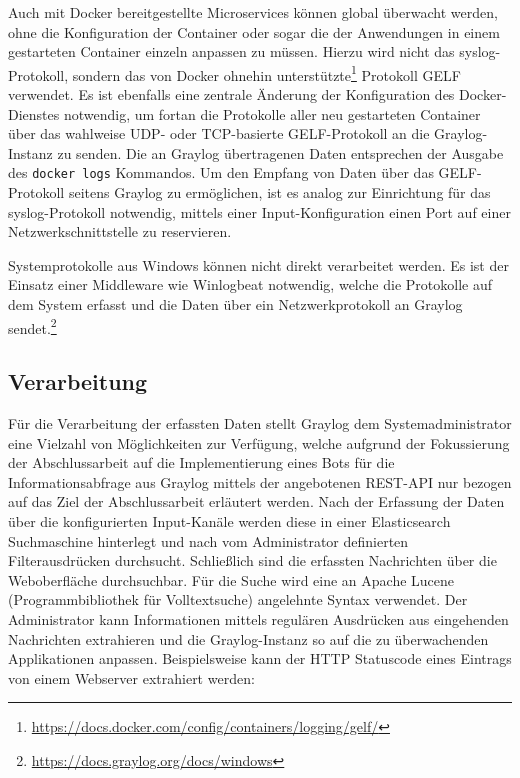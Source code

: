 Auch mit Docker bereitgestellte Microservices können global überwacht werden, ohne die Konfiguration der Container oder sogar die der Anwendungen in einem gestarteten Container einzeln anpassen zu müssen. Hierzu wird nicht das syslog-Protokoll, sondern das von Docker ohnehin unterstützte\footnote{\url{https://docs.docker.com/config/containers/logging/gelf/}} Protokoll GELF verwendet. Es ist ebenfalls eine zentrale Änderung der Konfiguration des Docker-Dienstes notwendig, um fortan die Protokolle aller neu gestarteten Container über das wahlweise UDP- oder TCP-basierte GELF-Protokoll an die Graylog-Instanz zu senden. Die an Graylog übertragenen Daten entsprechen der Ausgabe des \lstinline{docker logs} Kommandos. Um den Empfang von Daten über das GELF-Protokoll seitens Graylog zu ermöglichen, ist es analog zur Einrichtung für das syslog-Protokoll notwendig, mittels einer Input-Konfiguration einen Port auf einer Netzwerkschnittstelle zu reservieren.

Systemprotokolle aus Windows können nicht direkt verarbeitet werden. Es ist der Einsatz einer Middleware wie Winlogbeat notwendig, welche die Protokolle auf dem System erfasst und die Daten über ein Netzwerkprotokoll an Graylog sendet.\footnote{\url{https://docs.graylog.org/docs/windows}}

\subsection{Verarbeitung}

Für die Verarbeitung der erfassten Daten stellt Graylog dem Systemadministrator eine Vielzahl von Möglichkeiten zur Verfügung, welche aufgrund der Fokussierung der Abschlussarbeit auf die Implementierung eines Bots für die Informationsabfrage aus Graylog mittels der angebotenen REST-API nur bezogen auf das Ziel der Abschlussarbeit erläutert werden. Nach der Erfassung der Daten über die konfigurierten Input-Kanäle werden diese in einer Elasticsearch Suchmaschine hinterlegt und nach vom Administrator definierten Filterausdrücken durchsucht. Schließlich sind die erfassten Nachrichten über die Weboberfläche durchsuchbar. Für die Suche wird eine an Apache Lucene (Programmbibliothek für Volltextsuche) angelehnte Syntax verwendet. Der Administrator kann Informationen mittels regulären Ausdrücken aus eingehenden Nachrichten extrahieren und die Graylog-Instanz so auf die zu überwachenden Applikationen anpassen. Beispielsweise kann der HTTP Statuscode eines Eintrags von einem Webserver extrahiert werden:

